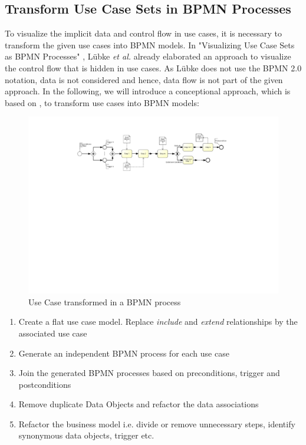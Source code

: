 \subsection{Transform Use Case Sets in BPMN Processes}
\label{sec:PrepApproach:TransformUCtoBPMN}
To visualize the implicit data and control flow in use cases, it is necessary to transform the given use cases into BPMN models. In "Visualizing Use Case Sets as BPMN Processes" \cite{VisualizeBPMN}, Lübke \textit{et al.} already elaborated an approach to visualize the control flow that is hidden in use cases. As Lübke does not use the BPMN 2.0 notation, data is not considered and hence, data flow is not part of the given approach. In the following, we will introduce a conceptional approach, which is based on \cite{VisualizeBPMN}, to transform use cases into BPMN models:

\begin{figure}[h!]
	\includegraphics[width=\textwidth, trim={6cm 14.5cm 6cm 1.5cm}]{img/usecaseTransformation.pdf}
	\caption{Use Case transformed in a BPMN process}
	\label{fig:useCaseTransformation}
\end{figure}

\begin{enumerate}
	\item Create a flat use case model. Replace \textit{include} and \textit{extend} relationships by the associated use case
	\item Generate an independent BPMN process for each use case
	\item Join the generated BPMN processes based on preconditions, trigger and postconditions
	\item Remove duplicate Data Objects and refactor the data associations
	\item Refactor the business model i.e. divide or remove unnecessary steps, identify synonymous data objects, trigger etc.
\end{enumerate}


